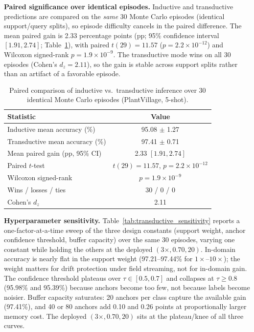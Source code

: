 \documentclass[preprint,12pt]{elsarticle}
\begin{document}
\textbf{Paired significance over identical episodes.} Inductive and transductive predictions are compared on the \emph{same} 30 Monte Carlo episodes (identical support/query splits), so episode difficulty cancels in the paired difference. The mean paired gain is 2.33 percentage points (pp; 95\% confidence interval $[1.91, 2.74]$; Table~\ref{tab:paired_test}), with paired $t(29) = 11.57$ ($p = 2.2 \times 10^{-12}$) and Wilcoxon signed-rank $p = 1.9 \times 10^{-9}$. The transductive mode wins on all 30 episodes (Cohen's $d_z = 2.11$), so the gain is stable across support splits rather than an artifact of a favorable episode.

\begin{table}[htbp]
\centering
\caption{Paired comparison of inductive vs.\ transductive inference over 30 identical Monte Carlo episodes (PlantVillage, 5-shot).}
\label{tab:paired_test}
\footnotesize
\setlength{\tabcolsep}{4pt}
\begin{tabular*}{\columnwidth}{@{\extracolsep{\fill}}lc}
\toprule
\textbf{Statistic} & \textbf{Value} \\
\midrule
Inductive mean accuracy (\%) & 95.08 $\pm$ 1.27 \\
Transductive mean accuracy (\%) & 97.41 $\pm$ 0.71 \\
Mean paired gain (pp, 95\% CI) & 2.33 $[1.91, 2.74]$ \\
Paired $t$-test & $t(29)=11.57$, $p=2.2\times10^{-12}$ \\
Wilcoxon signed-rank & $p=1.9\times10^{-9}$ \\
Wins / losses / ties & 30 / 0 / 0 \\
Cohen's $d_z$ & 2.11 \\
\bottomrule
\end{tabular*}
\end{table}

\textbf{Hyperparameter sensitivity.} Table~\ref{tab:transductive_sensitivity} reports a one-factor-at-a-time sweep of the three design constants (support weight, anchor confidence threshold, buffer capacity) over the same 30 episodes, varying one constant while holding the others at the deployed $(3\times, 0.70, 20)$. In-domain accuracy is nearly flat in the support weight (97.21--97.44\% for $1\times$--$10\times$); the weight matters for drift protection under field streaming, not for in-domain gain. The confidence threshold plateaus over $\tau \in [0.5, 0.7]$ and collapses at $\tau \ge 0.8$ (95.98\% and 95.39\%) because anchors become too few, not because labels become noisier. Buffer capacity saturates: 20 anchors per class capture the available gain (97.41\%), and 40 or 80 anchors add 0.10 and 0.26 points at proportionally larger memory cost. The deployed $(3\times, 0.70, 20)$ sits at the plateau/knee of all three curves.
\end{document}
